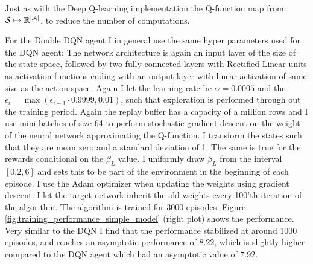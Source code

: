 Just as with the Deep Q-learning implementation the Q-function map from: $\mathcal{S} \mapsto \mathbb{R}^{\mid \mathcal{A} \mid}$, to reduce the number of computations. 

For the Double DQN agent I in general use the same hyper parameters used for the DQN agent: The network architecture is again an input layer of the size of the state space, followed by two fully connected layers with Rectified Linear units as activation functions ending with an output layer with linear activation of same size as the action space. Again I let the learning rate be $\alpha = 0.0005$ and the $\epsilon_i = \max (\epsilon_{i-1} \cdot 0.9999, 0.01)$, such that exploration is performed through out the training period. Again the replay buffer has a capacity of a million rows and I use mini batches of size 64 to perform stochastic gradient descent on the weight of the neural network approximating the Q-function. I transform the states such that they are mean zero and a standard deviation of 1. The same is true for the rewards conditional on the $\beta_L$ value. I uniformly draw $\beta_L$ from the interval $[0.2, 6]$ and sets this to be part of the environment in the beginning of each episode. I use the Adam optimizer when updating the weights using gradient descent. I let the target network inherit the old weights every 100'th iteration of the algorithm. The algorithm is trained for 3000 episodes. Figure \ref{fig:training_performance_simple_model} (right plot) shows the performance. Very similar to the DQN I find that the performance stabilized at around 1000 episodes, and reaches an asymptotic performance of $8.22$, which is slightly higher compared to the DQN agent which had an asymptotic value of $7.92$.

